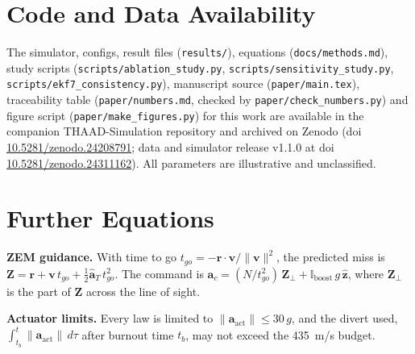 \documentclass[conference,letterpaper]{IEEEtran}
\newcommand{\vect}[1]{\mathbf{#1}}
\begin{document}
\section*{Code and Data Availability}

The simulator, configs, result files (\nolinkurl{results/}), equations (\nolinkurl{docs/methods.md}), study scripts (\nolinkurl{scripts/ablation_study.py}, \nolinkurl{scripts/sensitivity_study.py}, \nolinkurl{scripts/ekf7_consistency.py}), manuscript source (\nolinkurl{paper/main.tex}), traceability table (\nolinkurl{paper/numbers.md}, checked by \nolinkurl{paper/check_numbers.py}) and figure script (\nolinkurl{paper/make_figures.py}) for this work are available in the companion THAAD-Simulation repository and archived on Zenodo (doi \href{https://doi.org/10.5281/zenodo.24208791}{10.5281/zenodo.24208791}; data and simulator release v1.1.0 at doi \href{https://doi.org/10.5281/zenodo.24311162}{10.5281/zenodo.24311162}).
All parameters are illustrative and unclassified.




\appendices

\section{Further Equations}
\label{app:equations}

\textbf{ZEM guidance.} With time to go $t_{go} = -\vect r\cdot\vect v/\lVert\vect v\rVert^2$, the predicted miss is $\vect{Z} = \vect r + \vect v\,t_{go} + \tfrac12\hat{\vect a}_T\,t_{go}^2$.
The command is $\vect a_c = (N/t_{go}^2)\,\vect Z_\perp + \mathbb{I}_{\mathrm{boost}}\,g\,\hat{\vect z}$, where $\vect Z_\perp$ is the part of $\vect Z$ across the line of sight.

\textbf{Actuator limits.} Every law is limited to $\lVert\vect a_{\mathrm{act}}\rVert \le 30\,g$, and the divert used, $\int_{t_b}^{t}\lVert\vect a_{\mathrm{act}}\rVert\,d\tau$ after burnout time $t_b$, may not exceed the 435~m/s budget.
\end{document}
